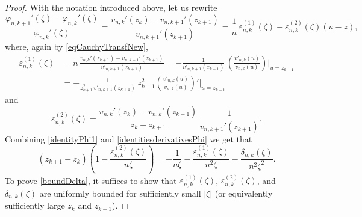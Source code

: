 \documentclass[10pt,a4paper]{amsart}
\theoremstyle{plain}
\theoremstyle{remark}
\begin{document}
\begin{proof}
With the notation introduced above, let us rewrite
\begin{equation} \label{identitiesderivativesPhi}
\frac{\varphi_{n, k+1}'\left( \zeta \right)-\varphi_{n, k}'(\zeta)}{\varphi_{n, k}'(\zeta)  }  = \frac{ v_{n, k}' \left( z_k \right) - v_{n, k+1}' \left( z_{k+1} \right) }{  v_{n,k+1}'\left( z_{k+1} \right)}  =  \frac{1}{n}\, \varepsilon_{n,k}^{(1)} (\zeta) - \varepsilon_{n,k}^{(2)} (\zeta)(u-z) ,
\end{equation}
where, again by \eqref{eqCauchyTransfNew}, 
\begin{equation}
\begin{split}
\varepsilon_{n,k}^{(1)} (\zeta) & = n \, \frac{  v_{n, k}'\left( z_{k+1}\right)-  v_{n, k+1}'(z_{k+1})}{ v'_{n, k+1}(z_{k+1}) } =- \frac{1}{   v'_{n, k+1}(z_{k+1}) } \,  \left(  \frac{  v'_{n,k}(u)}{  v_{n,k}(u)}\right)\bigg|_{u=z_{k+1}} \\
& =-  \frac{1}{z_{k+1}^2 \,  v'_{n, k+1}(z_{k+1}) } \, z_{k+1}^2 \left(  \frac{  v'_{n,k}(u)}{  v_{n,k}(u)}\right)'\bigg|_{u=z_{k+1}}
\label{expressionepsilonMod}
\end{split}
\end{equation}
and
$$
\varepsilon_{n,k}^{(2)} (\zeta) = \frac{ v_{n, k}' \left( z_k \right)- v_{n,k}'\left( z_{k+1} \right)}{    z_k-z_{k+1} } \, \frac{ 1}{  v_{n,k+1}'\left( z_{k+1} \right)  }.
$$
Combining \eqref{identityPhi1} and \eqref{identitiesderivativesPhi} we get that 
\begin{equation}
    \label{intermediate}
    \left(z_{k+1}-z_k\right) \left(1- \frac{\varepsilon_{n,k}^{(2)} (\zeta)}{n \zeta} \right) = -\frac{1}{n \zeta} -\frac{\varepsilon_{n,k}^{(1)} (\zeta)}{n^2 \zeta}  -\frac{\delta_{n, k}(\zeta)}{n^2 \zeta^2}.
\end{equation}
To prove \eqref{boundDelta}, it suffices to show that $\varepsilon_{n,k}^{(1)} (\zeta)$, $\varepsilon_{n,k}^{(2)} (\zeta)$, and $\delta_{n,k} (\zeta)$ are uniformly bounded for sufficiently small $|\zeta|$ (or equivalently sufficiently large $z_k$ and $z_{k+1}$). 


\end{proof}
\end{document}
